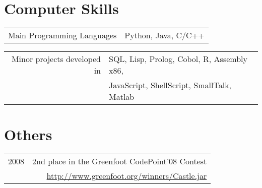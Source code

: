 \documentclass[a4paper,10pt]{article}
\begin{document}

\section{Computer Skills}


\begin{tabularx}{\textwidth}{D|S}
Main Programming Languages  & Python, Java, C/C++\\
\end{tabularx}

\begin{tabularx}{\textwidth}{D|S}
Minor projects developed in & SQL, Lisp, Prolog, Cobol, R, Assembly x86,\\
                            & JavaScript, ShellScript, SmallTalk, Matlab\\
\end{tabularx}


\section{Others}

\begin{tabularx}{\textwidth}{D|R}
2008    & 2nd place in the Greenfoot CodePoint'08 Contest\\
        & \url{http://www.greenfoot.org/winners/Castle.jar}\\
\end{tabularx}
\end{document}
